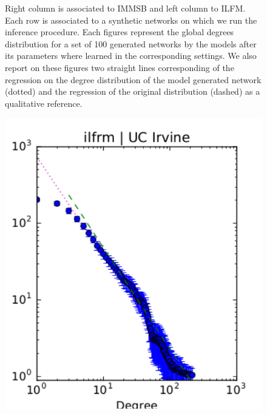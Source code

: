 \begin{figure}[h]
	\caption{Right column is associated to IMMSB and left column to ILFM. Each row is associated to a synthetic networks on which we run the inference procedure. Each figures represent the global degrees distribution for a set of 100 generated networks by the models after its parameters where learned in the corresponding settings.  We also report on these figures two straight lines corresponding of the regression on the degree distribution of the model generated network (dotted) and the regression of the original distribution (dashed) as a qualitative reference.}
	\label{fig:gen_graph_s}
\end{figure}

\begin{figure}[h]
	\centering
	
	\includegraphics[scale=0.4]{img/ilfrm_irvine_d}
	\endminipage

\end{figure}
